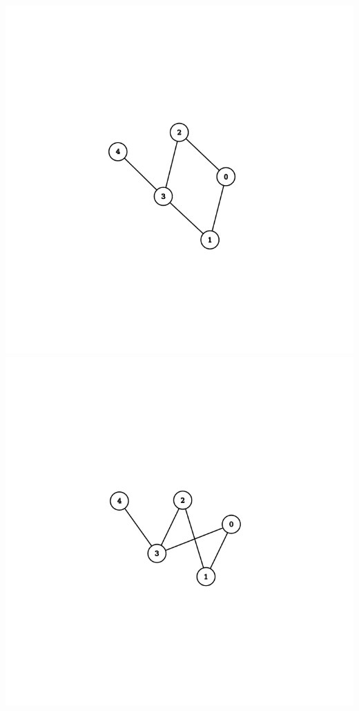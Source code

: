 \documentclass[12pt]{article}
\begin{document}
\begin{center}

\includegraphics[scale=0.25]{graph_matrix.png}	 
\includegraphics[scale=0.25]{graph_list.png}

\end{center}
\end{document}
